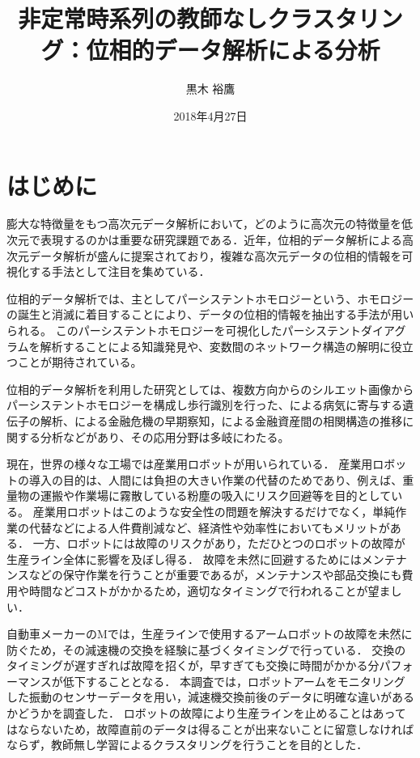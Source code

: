 \documentclass{jarticle}
\title{非定常時系列の教師なしクラスタリング：位相的データ解析による分析}
\author{黒木 裕鷹}
\date{2018年4月27日}
\begin{document}
\maketitle
\section{はじめに}
膨大な特徴量をもつ高次元データ解析において，どのように高次元の特徴量を低次元で表現するのかは重要な研究課題である．近年，位相的データ解析による高次元データ解析が盛んに提案されており，複雑な高次元データの位相的情報を可視化する手法として注目を集めている．

位相的データ解析では、主としてパーシステントホモロジー\cite{Edelsbrunner2002}という、ホモロジーの誕生と消滅に着目することにより、データの位相的情報を抽出する手法が用いられる。
このパーシステントホモロジーを可視化したパーシステントダイアグラム\cite{Otter2017}を解析することによる知識発見や、変数間のネットワーク構造の解明に役立つことが期待されている。

位相的データ解析を利用した研究としては、複数方向からのシルエット画像からパーシステントホモロジーを構成し歩行識別を行った\cite{Lamar2012}、\cite{Platt2016}による病気に寄与する遺伝子の解析、\cite{Gidea2017}による金融危機の早期察知，\cite{Gidea2018}による金融資産間の相関構造の推移に関する分析などがあり、その応用分野は多岐にわたる。

現在，世界の様々な工場では産業用ロボットが用いられている．
産業用ロボットの導入の目的は、人間には負担の大きい作業の代替のためであり、例えば、重量物の運搬や作業場に霧散している粉塵の吸入にリスク回避等を目的としている。
産業用ロボットはこのような安全性の問題を解決するだけでなく，単純作業の代替などによる人件費削減など、経済性や効率性においてもメリットがある．
一方、ロボットには故障のリスクがあり，ただひとつのロボットの故障が生産ライン全体に影響を及ぼし得る．
故障を未然に回避するためにはメンテナンスなどの保守作業を行うことが重要であるが，メンテナンスや部品交換にも費用や時間などコストがかかるため，適切なタイミングで行われることが望ましい．


自動車メーカーのMでは，生産ラインで使用するアームロボットの故障を未然に防ぐため，その減速機の交換を経験に基づくタイミングで行っている．
交換のタイミングが遅すぎれば故障を招くが，早すぎても交換に時間がかかる分パフォーマンスが低下することとなる．
本調査では，ロボットアームをモニタリングした振動のセンサーデータを用い，減速機交換前後のデータに明確な違いがあるかどうかを調査した．
ロボットの故障により生産ラインを止めることはあってはならないため，故障直前のデータは得ることが出来ないことに留意しなければならず，教師無し学習によるクラスタリングを行うことを目的とした．
\end{document}
